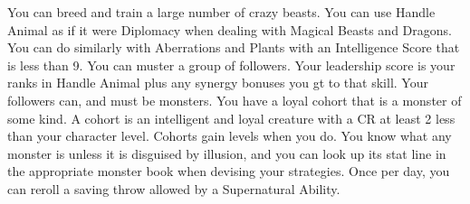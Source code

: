 {You can breed and train a large number of crazy beasts.}
{You can use Handle Animal as if it were Diplomacy when dealing with Magical Beasts and Dragons. You can do similarly with Aberrations and Plants with an Intelligence Score that is less than 9.}
{You can muster a group of followers. Your leadership score is your ranks in Handle Animal plus any synergy bonuses you gt to that skill. Your followers can, and must be monsters.}
{You have a loyal cohort that is a monster of some kind. A cohort is an intelligent and loyal creature with a CR at least 2 less than your character level. Cohorts gain levels when you do.}
{You know what any monster is unless it is disguised by illusion, and you can look up its stat line in the appropriate monster book when devising your strategies.}
{Once per day, you can reroll a saving throw allowed by a Supernatural Ability.}